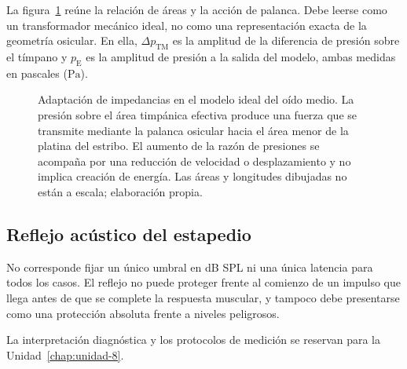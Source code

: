 La figura~\ref{fig:u6-adaptacion-oido-medio} reúne la relación de áreas y la
acción de palanca. Debe leerse como un transformador mecánico ideal, no como
una representación exacta de la geometría osicular. En ella,
\(\Delta p_\mathrm{TM}\) es la amplitud de la diferencia de presión sobre el
tímpano y \(p_\mathrm{E}\) es la amplitud de presión a la salida del modelo,
ambas medidas en pascales (\(\text{Pa}\)).

\begin{figure}[htbp]
    \centering
    
    \caption{Adaptación de impedancias en el modelo ideal del oído medio. La
    presión sobre el área timpánica efectiva produce una fuerza que se
    transmite mediante la palanca osicular hacia el área menor de la platina
    del estribo. El aumento de la razón de presiones se acompaña por una
    reducción de velocidad o desplazamiento y no implica creación de energía.
    Las áreas y longitudes dibujadas no están a escala; elaboración propia.}
    \label{fig:u6-adaptacion-oido-medio}
\end{figure}

\subsection{Reflejo acústico del estapedio}
\label{sec:u6-reflejo-estapedial}


No corresponde fijar un único umbral en dB SPL ni una única latencia para
todos los casos. El reflejo no puede proteger frente al comienzo de un impulso
que llega antes de que se complete la respuesta muscular, y tampoco debe
presentarse como una protección absoluta frente a niveles peligrosos.

 La interpretación diagnóstica y los protocolos de medición se
reservan para la Unidad~\ref{chap:unidad-8}.

